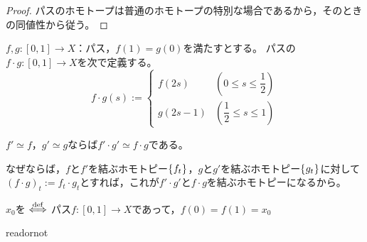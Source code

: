 \documentclass[uplatex]{jsarticle}
\begin{document}
\begin{proof}
  パスのホモトープは普通のホモトープの特別な場合であるから，そのときの同値性から従う。
\end{proof}

\begin{teigi}[パスの積（合成）]
  $f,g \colon [0,1] \longrightarrow X$：パス，$f(1) = g(0)$を満たすとする。
  パスの $f \cdot g \colon [0,1] \longrightarrow X$を次で定義する。
  \begin{equation}
    f \cdot g (s) := \begin{cases}
      f(2s) & \left( 0 \le s \le \dfrac{1}{2} \right) \\
      g(2s-1) & \left( \dfrac{1}{2} \le s \le 1 \right)
    \end{cases}
  \end{equation}
\end{teigi}

\sukima {} $f' \simeq f$，$g' \simeq g$ならば$f' \cdot g' \simeq f \cdot g$である。

なぜならば，$f$と$f'$を結ぶホモトピー$\Set{\hspace{-1.8pt} f_{t} \hspace{-1.8pt}}$，$g$と$g'$を結ぶホモトピー$\Set{\hspace{-1.8pt} g_{t} \hspace{-1.8pt}}$に対して
$\left( f \cdot g \right)_{t} := f_{t} \cdot g_{t}$とすれば，これが$f' \cdot g'$と$f \cdot g$を結ぶホモトピーになるから。

\begin{teigi}[ループ]
  $x_{0}$を $\overset{\mathrm{def}}{\Longleftrightarrow}$ パス$f \colon [0,1] \longrightarrow X$であって，$f(0) = f(1) = x_{0}$
\end{teigi}

\expandafter\ifx\csname readornot\endcsname\relax
  
\end{document}
